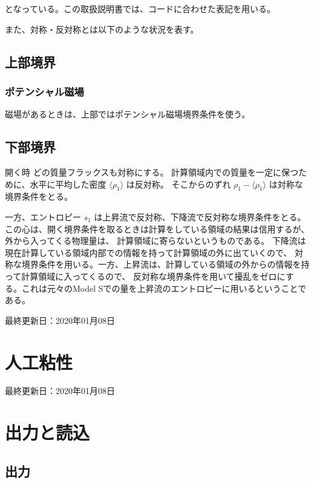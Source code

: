 \documentclass[letterpaper,10pt,dvipdfmx,report]{sphinxmanual}
\let\sphinxpxdimen\pdfpxdimen\else\newdimen\sphinxpxdimen
\begin{document}
となっている。この取扱説明書では、コードに合わせた表記を用いる。

また、対称・反対称とは以下のような状況を表す。

\noindent\sphinxincludegraphics[width=450\sphinxpxdimen]{{bc_sym}.png}


\section{上部境界}
\label{\detokenize{boundary:id2}}

\subsection{ポテンシャル磁場}
\label{\detokenize{boundary:id3}}
磁場があるときは、上部ではポテンシャル磁場境界条件を使う。


\section{下部境界}
\label{\detokenize{boundary:id4}}
開く時
どの質量フラックスも対称にする。 計算領域内での質量を一定に保つために、水平に平均した密度
\(\langle \rho_1\rangle\) は反対称。 そこからのずれ
\(\rho_1 - \langle \rho_1 \rangle\) は対称な境界条件をとる。

一方、エントロピー \(s_1\) は上昇流で反対称、下降流で反対称な境界条件をとる。
この心は、開く境界条件を取るときは計算をしている領域の結果は信用するが、外から入ってくる物理量は、
計算領域に寄らないというものである。 下降流は現在計算している領域内部での情報を持って計算領域の外に出ていくので、
対称な境界条件を用いる。一方、上昇流は、計算している領域の外からの情報を持って計算領域に入ってくるので、
反対称な境界条件を用いて擾乱をゼロにする。これは元々のModel Sでの量を上昇流のエントロピーに用いるということである。

最終更新日：2020年01月08日


\chapter{人工粘性}
\label{\detokenize{artdif:id1}}\label{\detokenize{artdif::doc}}
最終更新日：2020年01月08日


\chapter{出力と読込}
\label{\detokenize{io:id1}}\label{\detokenize{io::doc}}

\section{出力}
\label{\detokenize{io:id2}}
\end{document}
